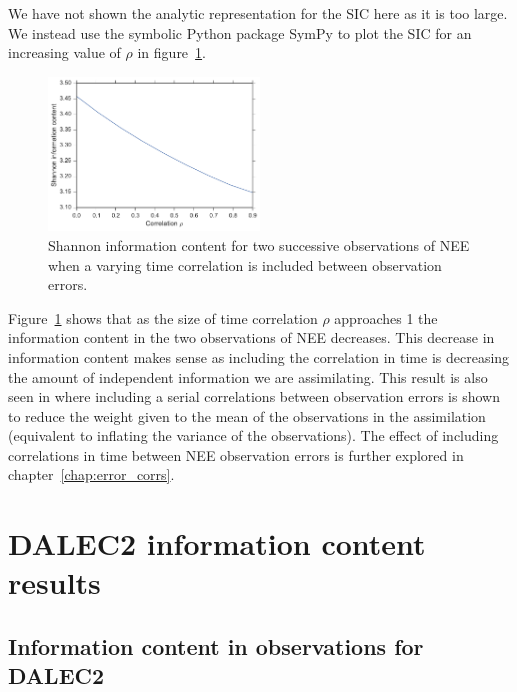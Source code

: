We have not shown the analytic representation for the SIC here as it is too large. We instead use the symbolic Python package SymPy \citep{Joyner:2012:OSC:2110170.2110185} to plot the SIC for an increasing value of \(\rho\) in figure~\ref{chap5:fig:sic_corr_D1}.
\begin{figure}[ht]
	\centering
        \includegraphics[width=0.5\textwidth]{chapter/chapter5/sic_corr_D1_nee.pdf}
    \caption{Shannon information content for two successive observations of NEE when a varying time correlation is included between observation errors.}
    \label{chap5:fig:sic_corr_D1}
\end{figure}
Figure~\ref{chap5:fig:sic_corr_D1} shows that as the size of time correlation \(\rho\) approaches 1 the information content in the two observations of NEE decreases. This decrease in information content makes sense as including the correlation in time is decreasing the amount of independent information we are assimilating. This result is also seen in \citet{jarvinen1999variational} where including a serial correlations between observation errors is shown to reduce the weight given to the mean of the observations in the assimilation (equivalent to inflating the variance of the observations). The effect of including correlations in time between NEE observation errors is further explored in chapter~\ref{chap:error_corrs}.

\section{DALEC2 information content results} \label{chap5:sec:D2_IC}%
\subsection{Information content in observations for DALEC2}

